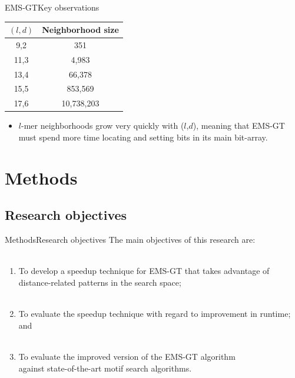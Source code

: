 \documentclass[pdf,xcolor={dvipsnames}]{beamer}
\begin{document}
	\begin{frame}{EMS-GT}{Key observations}
		\begin{table}[h] %
			\footnotesize
			\renewcommand{\arraystretch}{1.3}
			\label{tbl:neighbors_blockmasking}
			\centering
			\begin{tabular}{|c|c|}
			\hline 
			\bfseries\boldmath $(l,d)$ & \bfseries\boldmath Neighborhood size\\
			\hline
			 9,2 &         351 \\
			11,3 &       4,983 \\
			13,4 &      66,378 \\
			15,5 &     853,569 \\
			17,6 &  10,738,203 \\
			\hline\end{tabular}
			\end{table}
		\begin{itemize}
		\item $l$-mer neighborhoods grow very quickly with ($l$,$d$), meaning that EMS-GT must spend more time locating and setting bits in its main bit-array.\\
		\end{itemize}
		\end{frame}

\section{Methods}
	\subsection{Research objectives}
	\begin{frame}{Methods}{Research objectives}
		The main objectives of this research are:\\ \ \\
		\begin{enumerate}
		\item To {develop a speedup technique} for EMS-GT that takes advantage of distance-related patterns in the search space;\\ \ \\
		\item To {evaluate} the speedup technique with regard to {improvement in runtime}; and\\ \ \\
		\item To {evaluate} the improved version of the EMS-GT algorithm\\ {against state-of-the-art} motif search algorithms.
		\end{enumerate}
		\end{frame}
	
\end{document}
